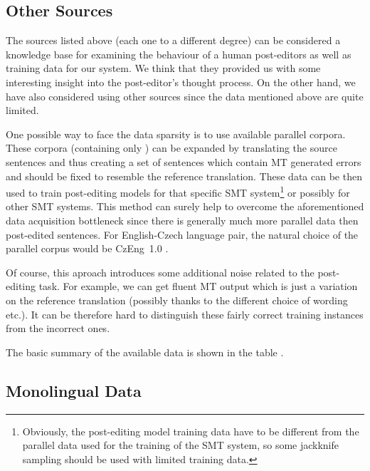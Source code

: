 \subsection{Other Sources}

The sources listed above (each one to a different degree) can
be considered a knowledge base for examining the behaviour of a human post-editors as well
as training data for our system. We think that they provided us with
some interesting insight into the post-editor's thought process. On the other hand,
we have also considered using other sources since the data mentioned above are quite
limited.

One possible way to face the data sparsity is to use available parallel corpora.
These corpora (containing only )
can be expanded by translating the source sentences and thus creating a set of 
sentences which contain MT generated errors and should be fixed to resemble the 
reference translation. These data can be then used to train post-editing models for that
specific SMT system\footnote{Obviously, the post-editing model training data have to be
different from the parallel data used for the training of the SMT system, so
some
jackknife sampling should be used with limited training data.} or possibly for
other SMT systems.
This method can surely help to overcome the aforementioned data acquisition bottleneck
since there is generally much more parallel data then post-edited sentences. For
English-Czech language pair, the natural choice of the parallel corpus would be
CzEng~1.0 \citep{czeng10:lrec2012}.


Of course, this aproach introduces some additional noise
related to the post-editing task. For example, we can get fluent MT output which
is just a variation on the reference translation (possibly thanks to the different
choice of wording etc.). It can be therefore hard to distinguish these fairly correct training
instances from the incorrect ones.

The basic summary of the available data is shown in the table .

\subsection{Monolingual Data}

